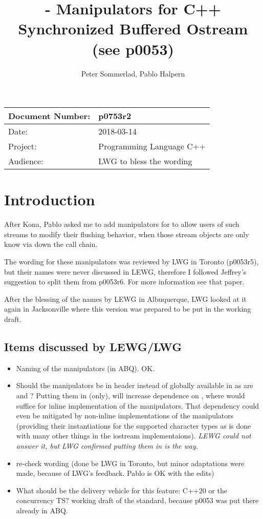\documentclass[ebook,11pt,article]{memoir}
\title{\papernumber{} - Manipulators for C++ Synchronized Buffered Ostream (see p0053)}
\author{Peter Sommerlad, Pablo Halpern}
\date{\paperdate}                %
\newcommand{\papernumber}{p0753r2}
\newcommand{\paperdate}{2018-03-14}
\begin{document}
\maketitle
\begin{center}
\begin{tabular}[t]{|l|l|}\hline 
Document Number:&  \papernumber \\\hline
Date: & \paperdate \\\hline
Project: & Programming Language C++\\\hline 
Audience: & LWG to bless the wording\\\hline
\end{tabular}
\end{center}
\chapter{Introduction}

After Kona, Pablo asked me to add  manipulators for  to allow users of such streams to modify their flushing behavior, when those stream objects are only know via  down the call chain.

The wording for these manipulators was reviewed by LWG in Toronto (p0053r5), but their names were never discussed in LEWG, therefore I followed Jeffrey's suggestion to split them from p0053r6. For more information see that paper.

After the blessing of the names by LEWG in Albuquerque, LWG looked at it again in Jacksonville where this version was prepared to be put in the working draft.

\section{Items discussed by LEWG/LWG}
\begin{itemize}
\item Naming of the manipulators (in ABQ). OK.
\item Should the manipulators be in header  instead of globally available in  as are  and ? Putting them in  (only), will increase dependence on , where  would suffice for inline implementation of the manipulators. That dependency could even be mitigated by non-inline implementations of the manipulators (providing their instantiations for the supported character types as is done with many other things in the iostream implementaions). \emph{LEWG could not answer it, but LWG confirmed putting them in  is the way.}
\item re-check wording (done be LWG in Toronto, but minor adaptations were made, because of LWG's feedback. Pablo is OK with the edits)
\item What should be the delivery vehicle for this feature: C++20 or the concurrency TS? working draft of the standard, because p0053 was put there already in ABQ.
\end{itemize}
\end{document}
